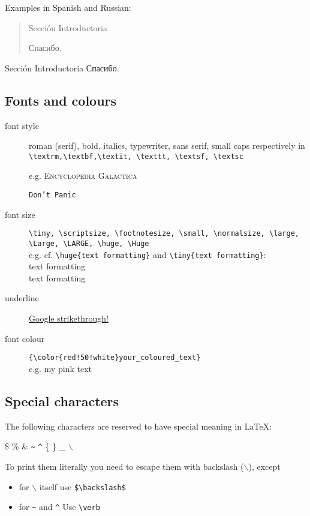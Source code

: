 \documentclass[a4paper,11pt]{article}
\begin{document}
Examples in Spanish and Russian:

\begin{center}
	\begin{quote}
		\foreignlanguage{spanish}{Sección Introductoria} 
		
		\foreignlanguage{russian}{Спасибо.}
	\end{quote}
	
	Sección Introductoria
	Спасибо.
\end{center}

\subsection{Fonts and colours}

\begin{description}
	\item[font style] roman (serif), bold, italics, typewriter, sans serif, small caps respectively in \\
	\verb|\textrm,\textbf,\textit, \texttt, \textsf, \textsc|
	
	e.g. \textsc{Encyclopedia Galactica} 
	
	\texttt{Don't Panic}
	
	\item[font size] \verb|\tiny, \scriptsize, \footnotesize, \small, \normalsize, \large, \Large, \LARGE, \huge, \Huge| \\
	e.g. cf. \verb|\huge{text formatting}| and \verb|\tiny{text formatting}|: \\
	\huge{text formatting} \\
	\tiny{text formatting}
	\normalsize
	
	\item[underline] \underline{Google strikethrough!}
	
	\item[font colour] \verb|{\color{red!50!white}your_coloured_text}| \\
	 e.g. {\color{red!50!white}my pink text}
 
\end{description}


\subsection{Special characters}
The following characters are reserved to have special meaning in \LaTeX:

\$ \% \& \verb|~| \verb|^| \{ \} \_ $\backslash$ 

To print them literally you need to escape them with backslash ($\backslash$), except
\begin{itemize}
	\item for $\backslash$ itself use \verb|$\backslash$|
	\item for \verb|~| and \verb|^| Use \verb|\verb| 
\end{itemize}
\end{document}
